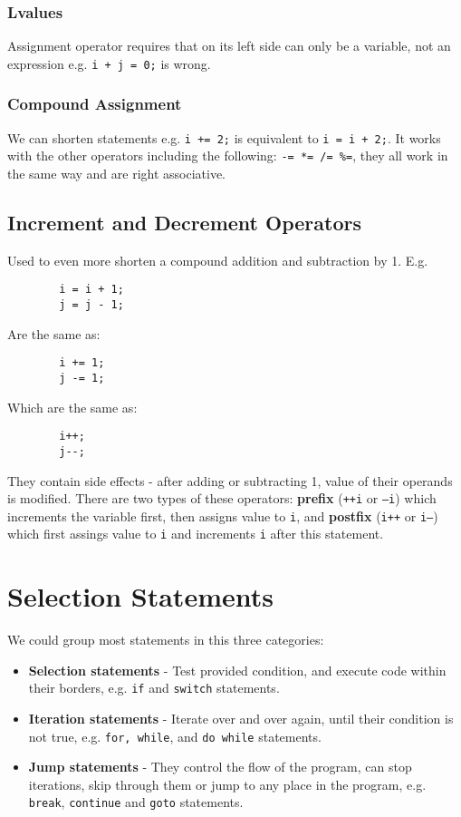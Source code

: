 \documentclass[12pt, openany]{book}
\begin{document}
    \subsection*{Lvalues}
    Assignment operator requires that on its left side can only be a variable, not an
    expression e.g. \texttt{i + j = 0;} is wrong.

    \subsection*{Compound Assignment}
    We can shorten statements e.g. \texttt{i += 2;} is equivalent to
    \texttt{i = i + 2;}. It works with the other operators including the following:
    \texttt{-= *= /= \%=}, they all work in the same way and are right associative.

    \section{Increment and Decrement Operators}
    Used to even more shorten a compound addition and subtraction by 1. E.g. 
    \begin{lstlisting}
        i = i + 1;
        j = j - 1;
    \end{lstlisting}
    Are the same as:
    \begin{lstlisting}
        i += 1;
        j -= 1;
    \end{lstlisting}
    Which are the same as:
    \begin{lstlisting}
        i++;
        j--;
    \end{lstlisting}

    They contain side effects - after adding or subtracting 1, value of their operands
    is modified. There are two types of these operators: \textbf{prefix} (\texttt{++i}
    or \texttt{---i}) which increments the variable first, then assigns value to \texttt{i},
    and \textbf{postfix} (\texttt{i++} or \texttt{i---}) which first assings value to
    \texttt{i} and increments \texttt{i} after this statement.

    \chapter{Selection Statements}
    We could group most statements in this three categories:
    \begin{itemize}
        \item \textbf{Selection statements} - Test provided condition, and execute code
        within their borders, e.g. \texttt{if} and \texttt{switch} statements.
        \item \textbf{Iteration statements} - Iterate over and over again, until their
        condition is not true, e.g. \texttt{for, while}, and \texttt{do while} statements.
        \item \textbf{Jump statements} - They control the flow of the program, can stop
        iterations, skip through them or jump to any place in the program, e.g. \texttt{break},
        \texttt{continue} and \texttt{goto} statements.
    \end{itemize} 
\end{document}
